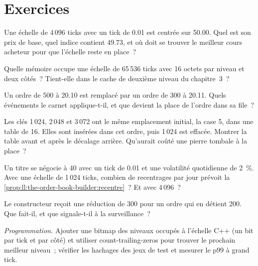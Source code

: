 \section{Exercices}

\begin{exercise}[$\star$]\label{exo:ll:the-order-book-builder:1}
Une échelle de 4\,096 ticks avec un tick de 0.01 est centrée sur 50.00. Quel est son prix de base, quel indice contient 49.73, et où
doit se trouver le meilleur cours acheteur pour que l'échelle reste en place~?
\end{exercise}

\begin{exercise}[$\star$]\label{exo:ll:the-order-book-builder:2}
Quelle mémoire occupe une échelle de 65\,536 ticks avec 16 octets par niveau et deux côtés~? Tient-elle dans le cache de deuxième niveau
du chapitre~3~?
\end{exercise}

\begin{exercise}[$\star$]\label{exo:ll:the-order-book-builder:3}
Un ordre de 500 à 20.10 est remplacé par un ordre de 300 à 20.11. Quels événements le carnet applique-t-il, et que devient
la place de l'ordre dans sa file~?
\end{exercise}

\begin{exercise}[$\star\star$]\label{exo:ll:the-order-book-builder:4}
Les clés 1\,024, 2\,048 et 3\,072 ont le même emplacement initial, la case 5, dans une table de 16. Elles sont insérées dans cet ordre, puis
1\,024 est effacée. Montrer la table avant et après le décalage arrière. Qu'aurait coûté une pierre tombale à la place~?
\end{exercise}

\begin{exercise}[$\star\star$]\label{exo:ll:the-order-book-builder:5}
Un titre se négocie à 40 avec un tick de 0.01 et une volatilité quotidienne de 2~\%. Avec une échelle de 1\,024 ticks, combien de
recentrages par jour prévoit la \cref{prop:ll:the-order-book-builder:recentre}~? Et avec 4\,096~?
\end{exercise}

\begin{exercise}[$\star\star$]\label{exo:ll:the-order-book-builder:6}
Le constructeur reçoit une réduction de 300 pour un ordre qui en détient 200. Que fait-il, et que signale-t-il à la surveillance~?
\end{exercise}

\begin{exercise}[$\star\star\star$]\label{exo:ll:the-order-book-builder:7}
\emph{Programmation.} Ajouter une bitmap des niveaux occupés à l'échelle C++ (un bit par tick et par côté) et utiliser count-trailing-zeros pour
trouver le prochain meilleur niveau~; vérifier les hachages des jeux de test et mesurer le p99 à grand tick.
\end{exercise}

